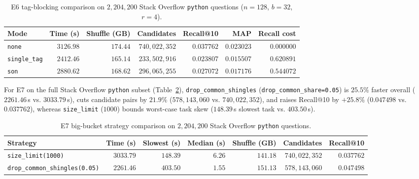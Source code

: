 {\begin{table}[t]
  \centering
  \small
  \setlength{\tabcolsep}{3pt}
  \caption{E6 tag-blocking comparison on $2{,}204{,}200$ Stack Overflow \texttt{python} questions ($n=128$, $b=32$, $r=4$).}
  \label{tab:e6-blocking}
  \begin{tabular}{@{}lrrrrrr@{}}
    \toprule
    Mode & Time (s) & Shuffle (GB) & Candidates & Recall@10 & MAP & Recall cost \\
    \midrule
    \texttt{none} & $3126.98$ & $174.44$ & $740{,}022{,}352$ & $0.037762$ & $0.023023$ & $0.000000$ \\ %
    \texttt{single\_tag} & $2412.46$ & $165.14$ & $233{,}502{,}916$ & $0.023807$ & $0.015507$ & $0.620891$ \\ %
    \texttt{son} & $2880.62$ & $168.62$ & $296{,}065{,}255$ & $0.027072$ & $0.017176$ & $0.544072$ \\ %
    \bottomrule
  \end{tabular}
\end{table}

For E7 on the full Stack Overflow \texttt{python} subset (Table~\ref{tab:e7-buckets}),
\texttt{drop\_common\_shingles} (\texttt{drop\_common\_share=0.05}) is $25.5\%$ faster overall
($2261.46$\,s vs. $3033.79$\,s), cuts candidate pairs by $21.9\%$ ($578{,}143{,}060$ vs.
$740{,}022{,}352$), and raises Recall@10 by $+25.8\%$ ($0.047498$ vs. $0.037762$), whereas
\texttt{size\_limit} ($1000$) bounds worst-case task skew ($148.39$\,s slowest task vs.
$403.50$\,s).

\begin{table}[t]
  \centering
  \small
  \setlength{\tabcolsep}{3pt}
  \caption{E7 big-bucket strategy comparison on $2{,}204{,}200$ Stack Overflow \texttt{python} questions.}
  \label{tab:e7-buckets}
  \begin{tabular}{@{}lrrrrrr@{}}
    \toprule
    Strategy & Time (s) & Slowest (s) & Median (s) & Shuffle (GB) & Candidates & Recall@10 \\
    \midrule
    \texttt{size\_limit(1000)} & $3033.79$ & $148.39$ & $6.26$ & $141.18$ & $740{,}022{,}352$ & $0.037762$ \\ %
    \texttt{drop\_common\_shingles(0.05)} & $2261.46$ & $403.50$ & $1.55$ & $151.13$ & $578{,}143{,}060$ & $0.047498$ \\ %
    \bottomrule
  \end{tabular}
\end{table}
}

